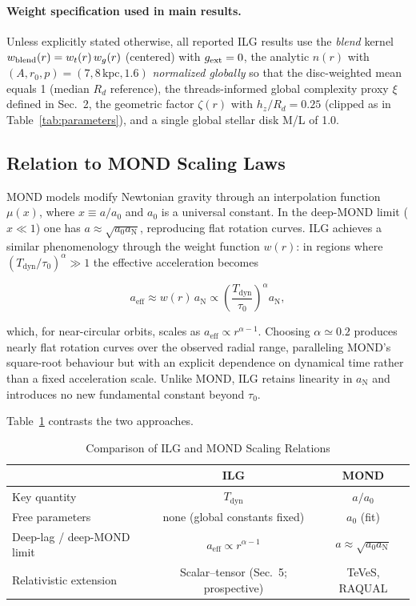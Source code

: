 \documentclass[fleqn,usenatbib]{mnras}
\begin{document}
\paragraph{Weight specification used in main results.} Unless explicitly stated otherwise, all reported ILG results use the \emph{blend} kernel $w_{\rm blend}(r)=w_t(r)\,w_g(r)$ (centered) with $g_{\rm ext}=0$, the analytic $n(r)$ with $(A,r_0,p)=(7,8\,\mathrm{kpc},1.6)$ \emph{normalized globally} so that the disc-weighted mean equals 1 (median $R_d$ reference), the threads-informed global complexity proxy $\xi$ defined in Sec.~2, the geometric factor $\zeta(r)$ with $h_z/R_d=0.25$ (clipped as in Table~\ref{tab:parameters}), and a single global stellar disk M/L of 1.0.

\subsection{Relation to MOND Scaling Laws}

MOND models modify Newtonian gravity through an interpolation function $\mu(x)$, where $x \equiv a/a_0$ and $a_0$ is a universal constant.  In the deep-MOND limit ($x \ll 1$) one has $a \approx \sqrt{a_0 a_\mathrm{N}}$, reproducing flat rotation curves.  ILG achieves a similar phenomenology through the weight function $w(r)$: in regions where $(T_\mathrm{dyn}/\tau_0)^\alpha \gg 1$ the effective acceleration becomes

\begin{equation}
a_\mathrm{eff} \approx w(r) \, a_\mathrm{N} \propto \left(\frac{T_\mathrm{dyn}}{\tau_0}\right)^\alpha a_\mathrm{N},
\end{equation}

which, for near-circular orbits, scales as $a_\mathrm{eff} \propto r^{\alpha-1}$.  Choosing $\alpha \simeq 0.2$ produces nearly flat rotation curves over the observed radial range, paralleling MOND's square-root behaviour but with an explicit dependence on dynamical time rather than a fixed acceleration scale.  Unlike MOND, ILG retains linearity in $a_\mathrm{N}$ and introduces no new fundamental constant beyond $\tau_0$.

Table~\ref{tab:mond_compare} contrasts the two approaches.

\begin{table}[h]
\centering
\caption{Comparison of ILG and MOND Scaling Relations}
\label{tab:mond_compare}
\begin{tabular}{l c c}
\toprule
 & ILG & MOND \\
\midrule
Key quantity & $T_\mathrm{dyn}$ & $a/a_0$ \\
Free parameters & none (global constants fixed) & $a_0$ (fit) \\
Deep-lag / deep-MOND limit & $a_\mathrm{eff} \propto r^{\alpha-1}$ & $a \approx \sqrt{a_0 a_\mathrm{N}}$ \\
Relativistic extension & Scalar–tensor (Sec.~5; prospective) & TeVeS, RAQUAL \\
\bottomrule
\end{tabular}
\end{table}
\end{document}
